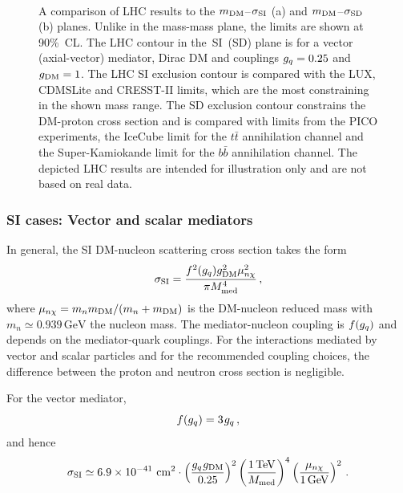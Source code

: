 \begin{figure}
\begin{subfigure}{0.45\textwidth}
		\caption{~}
		\label{fig:SD}
	\end{subfigure}
	\caption{		
	A comparison of  LHC results to the  $m_{\rm{DM}}$--$\hspace{0.25mm} \sigma_{\rm{SI}}$   (a) and  $m_{\rm{DM}}$--$\hspace{0.25mm} \sigma_{\rm{SD}}$ (b) planes. Unlike in the mass-mass plane, the limits are shown at 90\%~CL. The LHC contour in the~SI~(SD) plane is for a vector (axial-vector) mediator, Dirac DM and couplings $g_q=0.25$ and $g_{\rm{DM}}=1$. The LHC SI exclusion contour is compared with the LUX, CDMSLite and CRESST-II limits, which are the most constraining in the  shown mass range. The  SD exclusion contour constrains the DM-proton  cross section and is compared with limits from the PICO experiments, the IceCube limit for the $t\bar{t}$ annihilation channel and the Super-Kamiokande limit for the $b\bar{b}$ annihilation channel. The  depicted LHC results are intended for illustration only and are not based on real data.				 
	}   
	\label{fig:SISD}	
\end{figure}





\subsubsection{SI cases: Vector and scalar mediators}
\label{sub:spinindependent}

In general, the  SI DM-nucleon scattering  cross section takes the form
\begin{equation}
\sigma_{\rm{SI}}=\frac{f^2(g_q) g_{\rm{DM}}^2 \mu^2_{n\chi}}{\pi M_{\rm{med}}^4}\,,
\end{equation}
where $\mu_{n\chi}= m_n m_{\rm{DM}}/(m_n+m_{\rm{DM}})$ is the DM-nucleon reduced mass with $m_n \simeq 0.939 \, \mathrm{GeV}$ the nucleon mass. The mediator-nucleon coupling is $f(g_q)$ and depends on the mediator-quark couplings. For the interactions mediated by vector and scalar particles and for the recommended coupling choices, the difference between the proton and neutron  cross section is negligible. 
 
For the vector mediator, 
\begin{equation}
f(g_q) = 3 \hspace{0.25mm} g_q \,, 
\end{equation} 
and hence
\begin{align}
\label{eq:SI2MSDM}
 \sigma_{\rm{SI}} \simeq 6.9\times 10^{-41}~\mathrm{cm}^2\cdot\left(\frac{g_q \hspace{0.25mm} g_{\rm{DM}}}{0.25}\right)^2\left( \frac{1 \, \mathrm{TeV}}{M_{\rm{med}}}\right)^4\left(\frac{\mu_{n\chi}}{1 \, \mathrm{GeV}} \right)^2\,.
\end{align}

